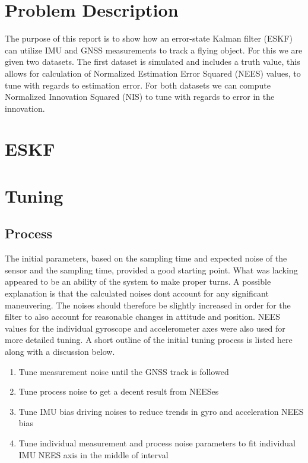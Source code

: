 \section{Problem Description}\label{sec:prob_descr}

The purpose of this report is to show how an error-state Kalman filter (ESKF)
can utilize IMU and GNSS measurements to track a flying object. 
For this we are given two datasets.
The first dataset is simulated and includes a truth value,
this allows for calculation of Normalized Estimation Error Squared (NEES) values,
to tune with regards to estimation error.
For both datasets we can compute Normalized Innovation Squared (NIS) to tune 
with regards to error in the innovation.

\section{ESKF}\label{sec:eskf}



\section{Tuning}\label{sec:tuning}

\subsection{Process}

The initial parameters, based on the sampling time and expected 
noise of the sensor and the sampling time, provided a good starting point.
What was lacking appeared to be an ability of the system to make proper turns.
A possible explanation is that the calculated noises dont account for
any significant maneuvering. 
The noises should therefore be slightly increased in order for the filter
to also account for reasonable changes in attitude and position.
NEES values for the individual gyroscope and accelerometer axes 
were also used for more detailed tuning.
A short outline of the initial tuning process is listed here along with a discussion below.

\begin{enumerate}
	\item Tune measurement noise until the GNSS track is followed
	\item Tune process noise to get a decent result from NEESes
	\item Tune IMU bias driving noises to reduce trends in gyro and acceleration NEES bias
	\item Tune individual measurement and process noise parameters to fit individual IMU NEES axis in the middle of interval
\end{enumerate}

